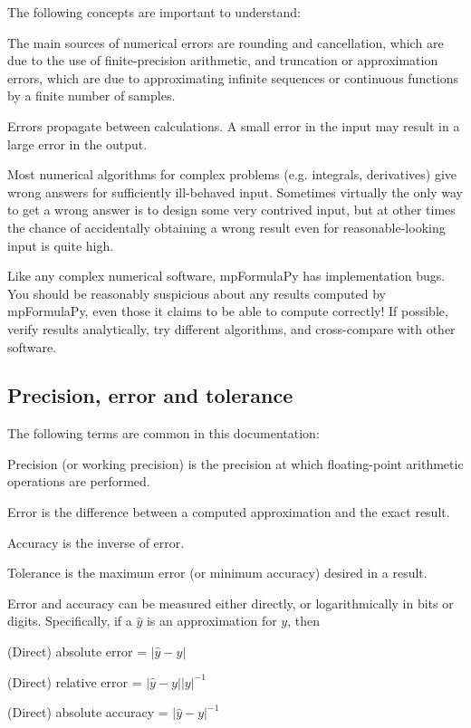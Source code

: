 \vpara
The following concepts are important to understand:

\vpara
The main sources of numerical errors are rounding and cancellation, which are due to the use of finite-precision arithmetic, and truncation or approximation errors, which are due to approximating infinite sequences or continuous functions by a finite number of samples.

\vpara
Errors propagate between calculations. A small error in the input may result in a large error in the output.

\vpara
Most numerical algorithms for complex problems (e.g. integrals, derivatives) give wrong answers for sufficiently ill-behaved input. Sometimes virtually the only way to get a wrong answer is to design some very contrived input, but at other times the chance of accidentally obtaining a wrong result even for reasonable-looking input is quite high.

\vpara
Like any complex numerical software, mpFormulaPy has implementation bugs. You should be reasonably suspicious about any results computed by mpFormulaPy, even those it claims to be able to compute correctly! If possible, verify results analytically, try different algorithms, and cross-compare with other software.



\subsection{Precision, error and tolerance}

The following terms are common in this documentation:

\vpara
Precision (or working precision) is the precision at which floating-point arithmetic operations are performed.

\vpara
Error is the difference between a computed approximation and the exact result.

\vpara
Accuracy is the inverse of error.

\vpara
Tolerance is the maximum error (or minimum accuracy) desired in a result.

\vpara
Error and accuracy can be measured either directly, or logarithmically in bits or digits. Specifically, if a $\hat{y}$ is an approximation for $y$, then

\vpara
(Direct) absolute error = $|\hat{y} - y|$

(Direct) relative error = $|\hat{y} - y||y|^{-1}$

(Direct) absolute accuracy = $|\hat{y} - y|^{-1}$

